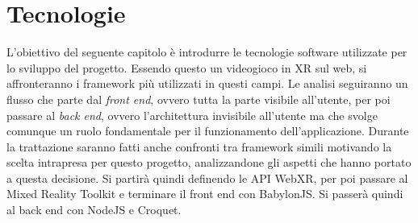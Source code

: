 \chapter{Tecnologie}\label{chap:Tecnologie}
L'obiettivo del seguente capitolo è introdurre le tecnologie software utilizzate per lo sviluppo del progetto. Essendo questo un videogioco in XR sul web, si affronteranno i framework
più utilizzati in questi campi. Le analisi seguiranno un flusso che parte dal \textit{front end}, ovvero tutta la parte visibile all'utente, per poi passare al \textit{back end}, ovvero
l'architettura invisibile all'utente ma che svolge comunque un ruolo fondamentale per il funzionamento dell'applicazione. Durante la trattazione saranno fatti anche confronti tra
framework simili motivando la scelta intrapresa per questo progetto, analizzandone gli aspetti che hanno portato a questa decisione. Si partirà quindi definendo le API WebXR, per poi
passare al Mixed Reality Toolkit e terminare il front end con BabylonJS. Si passerà quindi al back end con NodeJS e Croquet. 

